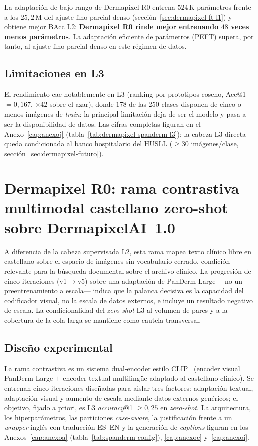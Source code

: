 La adaptación de bajo rango de Dermapixel R0 entrena $524$\,K
parámetros frente a los $25{,}2$\,M del ajuste fino parcial denso
(sección~\ref{sec:dermapixel-ft-l1}) y obtiene mejor BAcc L2:
\textbf{Dermapixel R0 rinde mejor entrenando $48$ veces menos
parámetros}. La adaptación eficiente de parámetros (PEFT) supera, por
tanto, al ajuste fino parcial denso en este régimen de datos.

\subsection{Limitaciones en L3}

El rendimiento cae notablemente en L3 (ranking por prototipos coseno,
Acc@1 $= 0{,}167$, $\times 42$ sobre el azar), donde $178$ de las $250$
clases disponen de cinco o menos imágenes de \emph{train}: la principal
limitación deja de ser el modelo y pasa a ser la disponibilidad de
datos. Las cifras completas figuran en el Anexo~\ref{cap:anexoj}
(tabla~\ref{tab:dermapixel-spanderm-l3}); la cabeza L3 directa queda
condicionada al banco hospitalario del HUSLL ($\geq 30$ imágenes/clase,
sección~\ref{sec:dermapixel-futuro}).

\section{Dermapixel R0: rama contrastiva multimodal castellano
zero-shot sobre DermapixelAI~1.0}
\label{sec:spanderm-clip}

A diferencia de la cabeza supervisada L2, esta rama mapea texto
clínico libre en castellano sobre el espacio de imágenes sin
vocabulario cerrado, condición relevante para la búsqueda documental
sobre el archivo clínico. La progresión de cinco iteraciones
(v1$\to$v5) sobre una adaptación de PanDerm Large ---no un
preentrenamiento a escala--- indica que la palanca decisiva es la
capacidad del codificador visual, no la escala de datos externos, e
incluye un resultado negativo de escala. La condicionalidad del
\emph{zero-shot} L3 al volumen de pares y a la cobertura de la cola
larga se mantiene como cautela transversal.

\subsection{Diseño experimental}

La rama contrastiva es un sistema dual-encoder estilo
CLIP~\cite{clip2021} (encoder visual PanDerm Large $+$ encoder textual
multilingüe adaptado al castellano clínico). Se entrenan cinco
iteraciones diseñadas para aislar tres factores: adaptación textual,
adaptación visual y aumento de escala mediante datos externos
genéricos; el objetivo, fijado a priori, es L3 \emph{accuracy}@1
$\geq 0{,}25$ en \emph{zero-shot}. La arquitectura, los hiperparámetros,
las particiones \emph{case-aware}, la justificación frente a un
\emph{wrapper} inglés con traducción ES--EN y la generación de
\emph{captions} figuran en los Anexos~\ref{cap:anexoa}
(tabla~\ref{tab:spanderm-config}), \ref{cap:anexoc}
y~\ref{cap:anexoi}.

